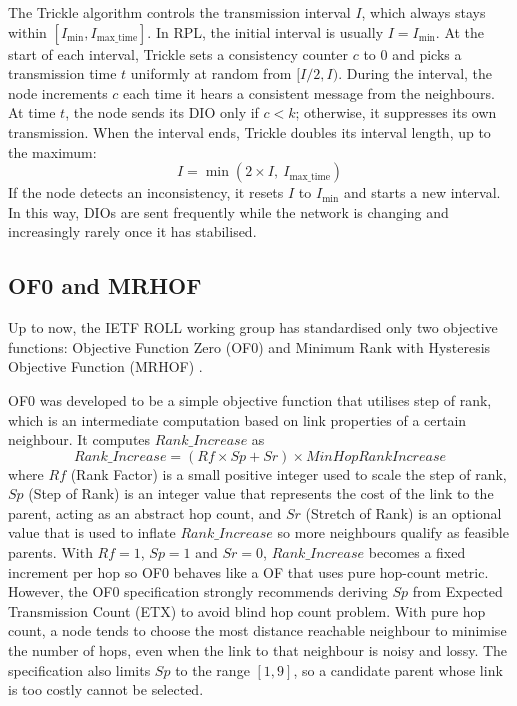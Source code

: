 The Trickle algorithm controls the transmission interval $I$, which
always stays within $[I_{\mathrm{min}}, I_{\mathrm{max\_time}}]$. In RPL,
the initial interval is usually $I = I_{\mathrm{min}}$.
At the start of each interval, Trickle sets a consistency counter $c$
to $0$ and picks a
transmission time $t$ uniformly at random from $[I/2, I)$. During the
interval, the node increments $c$ each time it hears a consistent
message from the neighbours. At time $t$, the node sends its DIO only if
$c < k$; otherwise, it suppresses its own transmission. When the interval
ends, Trickle doubles its interval length, up to the maximum:
\begin{equation}
    I = \min(2 \times I,\ I_{\mathrm{max\_time}})
\end{equation}
If the node detects an inconsistency, it
resets $I$ to $I_{\mathrm{min}}$ and starts a new interval.
In this way, DIOs are sent frequently while the network is changing and
increasingly rarely once it has stabilised.

\subsection{OF0 and MRHOF}
Up to now, the IETF ROLL working group has standardised only two
objective functions: Objective Function Zero (OF0) \cite{rfc6552} and
Minimum Rank with Hysteresis Objective Function (MRHOF) \cite{rfc6719}.

OF0 was developed to be a simple objective function that utilises step
of rank, which is an intermediate computation based on link
properties of a certain neighbour. It computes $\mathit{Rank\_Increase}$ as
\begin{equation}
    \mathit{Rank\_Increase} = (\mathit{Rf} \times \mathit{Sp} +
    \mathit{Sr}) \times \mathit{MinHopRankIncrease}
\end{equation}
where $\mathit{Rf}$ (Rank Factor) is a small positive integer used to scale
the step of rank, $\mathit{Sp}$ (Step of Rank) is an integer value
that represents the cost of the link to the parent, acting as an
abstract hop count, and $\mathit{Sr}$
(Stretch of Rank) is an optional value that is used to inflate
$\mathit{Rank\_Increase}$ so more neighbours qualify as feasible parents.
With $\mathit{Rf} = 1$, $\mathit{Sp} = 1$ and $\mathit{Sr} = 0$,
$\mathit{Rank\_Increase}$ becomes a fixed increment per hop so OF0
behaves like a OF that uses pure hop-count metric. However, the OF0
specification strongly
recommends deriving $\mathit{Sp}$
from Expected Transmission Count (ETX) to avoid blind hop count
problem. With pure hop count, a node
tends to choose the most distance reachable neighbour to minimise the
number of hops, even when the link to that neighbour is noisy and lossy.
The specification also limits $\mathit{Sp}$ to the range $[1, 9]$, so
a candidate parent whose link is too costly cannot be selected.

